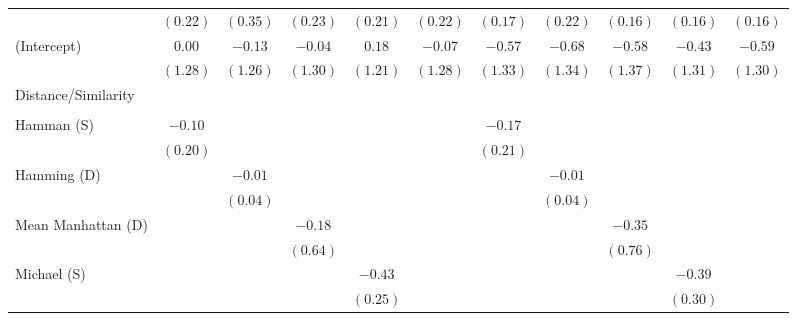 \documentclass[]{article}
\begin{document}
\begin{landscape}
\begin{table}
\begin{center}
\begin{tabular}{l c c c c c c c c c c }
                           & $(0.22)$     & $(0.35)$   & $(0.23)$    & $(0.21)$     & $(0.22)$    & $(0.17)$     & $(0.22)$    & $(0.16)$    & $(0.16)$    & $(0.16)$    \\
(Intercept)                & $0.00$       & $-0.13$    & $-0.04$     & $0.18$       & $-0.07$     & $-0.57$      & $-0.68$     & $-0.58$     & $-0.43$     & $-0.59$     \\
                           & $(1.28)$     & $(1.26)$   & $(1.30)$    & $(1.21)$     & $(1.28)$    & $(1.33)$     & $(1.34)$    & $(1.37)$    & $(1.31)$    & $(1.30)$    \\
Distance/Similarity        &              &            &             &              &             &              &             &             &             &             \\
                           &              &            &             &              &             &              &             &             &             &             \\
\quad Hamman (S)           & $-0.10$      &            &             &              &             & $-0.17$      &             &             &             &             \\
                           & $(0.20)$     &            &             &              &             & $(0.21)$     &             &             &             &             \\
\quad Hamming (D)          &              & $-0.01$    &             &              &             &              & $-0.01$     &             &             &             \\
                           &              & $(0.04)$   &             &              &             &              & $(0.04)$    &             &             &             \\
\quad Mean Manhattan (D)   &              &            & $-0.18$     &              &             &              &             & $-0.35$     &             &             \\
                           &              &            & $(0.64)$    &              &             &              &             & $(0.76)$    &             &             \\
\quad Michael (S)          &              &            &             & $-0.43$      &             &              &             &             & $-0.39$     &             \\
                           &              &            &             & $(0.25)$     &             &              &             &             & $(0.30)$    &             \\

\end{tabular}
\end{center}
\end{table}
\end{landscape}
\end{document}
